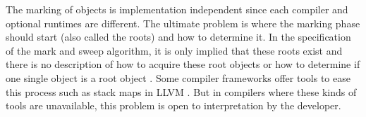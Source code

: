 The marking of objects is implementation independent since each compiler and optional runtimes
are different. The ultimate problem is where the marking phase should start (also called
the roots) and how to determine it. In the specification of the mark and sweep algorithm, it is
only implied that these roots exist and there is no description of how to acquire these root
objects or how to determine if one single object is a root object \citep[p.~19]{gcollHandbook}.
Some compiler frameworks offer tools to ease this process such as stack maps in
LLVM \citep{llvmStackMaps}. But in compilers where these kinds of tools are unavailable,
this problem is open to interpretation by the developer.